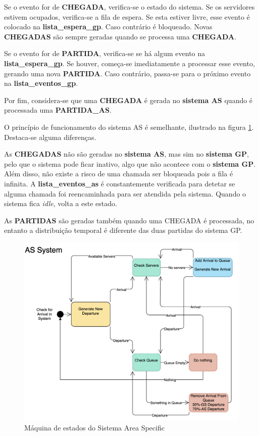 Se o evento for de \textbf{CHEGADA}, verifica-se o estado do sistema.
Se os servidores estivem ocupados, verifica-se a fila de espera.
Se esta estiver livre, esse evento é colocado na \textbf{lista\_espera\_gp}.
Caso contrário é bloqueado.
Novas \textbf{CHEGADAS} são sempre geradas quando se processa uma \textbf{CHEGADA}.

Se o evento for de \textbf{PARTIDA}, verifica-se se há algum evento na \textbf{lista\_espera\_gp}.
Se houver, começa-se imediatamente a processar esse evento, gerando uma nova \textbf{PARTIDA}.
Caso contrário, passa-se para o próximo evento na \textbf{lista\_eventos\_gp}.

Por fim, considera-se que uma \textbf{CHEGADA} é gerada no \textbf{sistema AS} quando é processada uma \textbf{PARTIDA\_AS}.


\noindent
\newline
O princípio de funcionamento do sistema AS é semelhante, ilustrado na figura \ref{fig:sm_as}. Destaca-se alguma diferenças.


As \textbf{CHEGADAS} não são geradas no \textbf{sistema AS}, mas sim no \textbf{sistema GP}, pelo que o sistema pode ficar inativo, algo que não acontece com o \textbf{sistema GP}.
Além disso, não existe a risco de uma chamada ser bloqueada pois a fila é infinita.
A \textbf{lista\_eventos\_as} é constantemente verificada para detetar se alguma chamada foi reencaminhada para ser atendida pela sistema. Quando o sistema fica \textit{idle}, volta a este estado.

As \textbf{PARTIDAS} são geradas também quando uma CHEGADA é processada, no entanto a distribuição temporal é diferente das duas partidas do sistema GP.

\begin{figure}[H]
    \centering
    \includegraphics[width=.7\linewidth]{figs/intro/sm_as.png}
    \caption{Máquina de estados do Sistema Area Specific}
    \label{fig:sm_as}
\end{figure}

